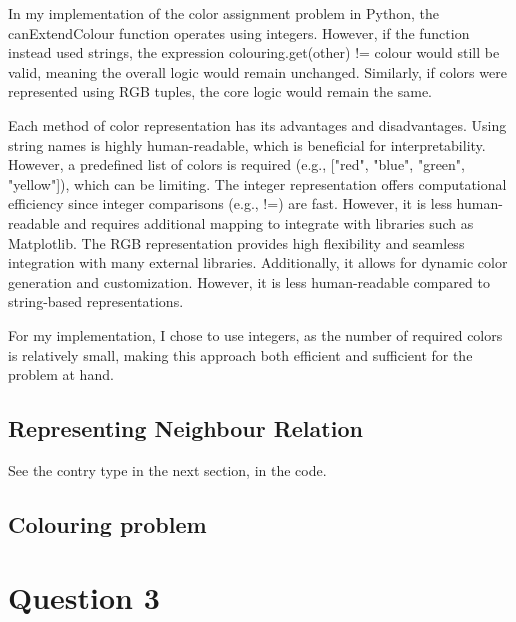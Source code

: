 \documentclass{article}
\begin{document}
In my implementation of the color assignment problem in Python, the canExtendColour function operates using integers. However, if the function instead used strings, the expression colouring.get(other) != colour would still be valid, meaning the overall logic would remain unchanged. Similarly, if colors were represented using RGB tuples, the core logic would remain the same.

Each method of color representation has its advantages and disadvantages. Using string names is highly human-readable, which is beneficial for interpretability. However, a predefined list of colors is required (e.g., ["red", "blue", "green", "yellow"]), which can be limiting. The integer representation offers computational efficiency since integer comparisons (e.g., !=) are fast. However, it is less human-readable and requires additional mapping to integrate with libraries such as Matplotlib. The RGB representation provides high flexibility and seamless integration with many external libraries. Additionally, it allows for dynamic color generation and customization. However, it is less human-readable compared to string-based representations.

For my implementation, I chose to use integers, as the number of required colors is relatively small, making this approach both efficient and sufficient for the problem at hand.

\subsection{Representing Neighbour Relation}

See the contry type in the next section, in the code.


\subsection{Colouring problem}







\section{ Question 3}

\subsection{}
\end{document}
